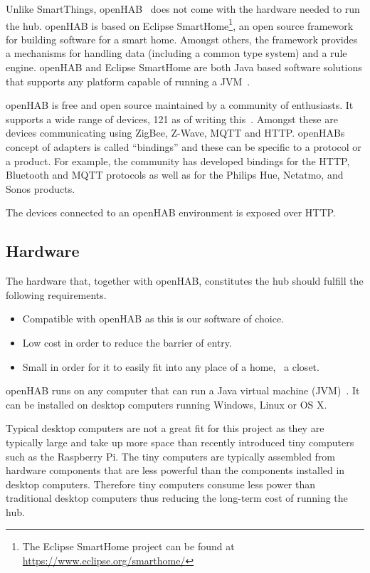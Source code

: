 Unlike SmartThings, openHAB~\cite{OPENHAB} does not come with the hardware needed to run the hub.
openHAB is based on Eclipse SmartHome\footnote{The Eclipse SmartHome project can be found at \url{https://www.eclipse.org/smarthome/}}, an open source framework for building software for a smart home. Amongst others, the framework provides a mechanisms for handling data (including a common type system) and a rule engine.
openHAB and Eclipse SmartHome are both Java based software solutions that supports any platform capable of running a JVM~\cite{openhab:introduction}.

openHAB is free and open source maintained by a community of enthusiasts. It supports a wide range of devices, 121 as of writing this~\cite{openhab:supported-technologies}. Amongst these are devices communicating using ZigBee, Z-Wave, MQTT and HTTP. openHABs concept of adapters is called ``bindings'' and these can be specific to a protocol or a product. For example, the community has developed bindings for the HTTP, Bluetooth and MQTT protocols as well as for the Philips Hue, Netatmo, and Sonos products.

The devices connected to an openHAB environment is exposed over HTTP.

\subsection{Hardware}

The hardware that, together with openHAB, constitutes the hub should fulfill the following requirements.

\begin{itemize}
\item Compatible with openHAB as this is our software of choice.
\item Low cost in order to reduce the barrier of entry.
\item Small in order for it to easily fit into any place of a home, \eg~a closet.
\end{itemize}

openHAB runs on any computer that can run a Java virtual machine (JVM)~\cite{openhab:introduction}. It can be installed on desktop computers running Windows, Linux or OS X.

Typical desktop computers are not a great fit for this project as they are typically large and take up more space than recently introduced tiny computers such as the Raspberry Pi. The tiny computers are typically assembled from hardware components that are less powerful than the components installed in desktop computers. Therefore tiny computers consume less power than traditional desktop computers thus reducing the long-term cost of running the hub.

